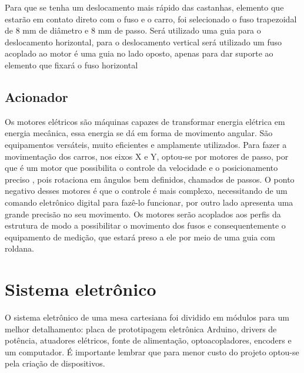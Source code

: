Para que se tenha um deslocamento mais rápido das castanhas, elemento que estarão em contato 
direto com o fuso e o carro, foi selecionado o fuso trapezoidal de  8 mm de diâmetro e 8 mm de passo.  
Será utilizado uma guia para o deslocamento horizontal, para o deslocamento vertical será utilizado 
um fuso acoplado ao motor é uma guia no lado oposto, apenas para dar suporte ao elemento que fixará 
o fuso horizontal 

\subsection{Acionador}\label{subsec:metacionador}

Os motores elétricos são máquinas capazes de transformar energia elétrica em energia mecânica, 
essa energia se dá em forma de movimento angular. São equipamentos versáteis, muito eficientes 
e amplamente utilizados. Para fazer a movimentação dos carros, nos eixos X e Y, optou-se por 
motores de passo, por que é um motor que possibilita o controle da velocidade e o posicionamento 
preciso , pois rotaciona em ângulos bem definidos, chamados de passos. O ponto negativo desses 
motores é que o controle é mais complexo, necessitando de um comando eletrônico digital para 
fazê-lo funcionar, por outro lado apresenta uma grande precisão no seu movimento. Os motores 
serão acoplados aos perfis da estrutura de modo a possibilitar o movimento dos fusos e consequentemente 
o equipamento de medição, que estará preso a ele por meio de uma guia com roldana. 

\section{Sistema eletrônico}\label{sec:metsisele}

O sistema eletrônico de uma mesa cartesiana foi dividido em módulos para um melhor detalhamento: 
placa de prototipagem eletrônica Arduino, drivers de potência, atuadores elétricos, fonte de alimentação, 
optoacopladores, encoders e um computador. É importante lembrar que para menor custo do projeto optou-se 
pela criação de dispositivos.


